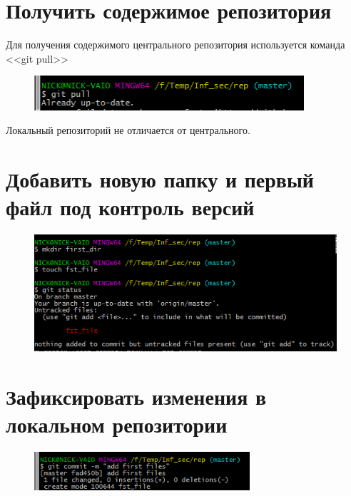 \documentclass[utf8x, 12pt]{G7-32}
\begin{document}
\section{Получить содержимое репозитория}

Для получения содержимого центрального репозитория используется команда <<git pull>> 

\begin{figure}[hhh!]
	\begin{center}
		\includegraphics[width=10cm]{img/2}
	\end{center}
\end{figure}	

Локальный репозиторий не отличается от центрального.

\newpage

\section{Добавить новую папку и первый файл под контроль версий}

\begin{figure}[hhh!]
	\begin{center}
		\includegraphics[width=12cm]{img/3}
	\end{center}
\end{figure}	


\section{Зафиксировать изменения в локальном репозитории}

\begin{figure}[hhh!]
	\begin{center}
		\includegraphics[width=8cm]{img/4}
	\end{center}
\end{figure}
\end{document}
